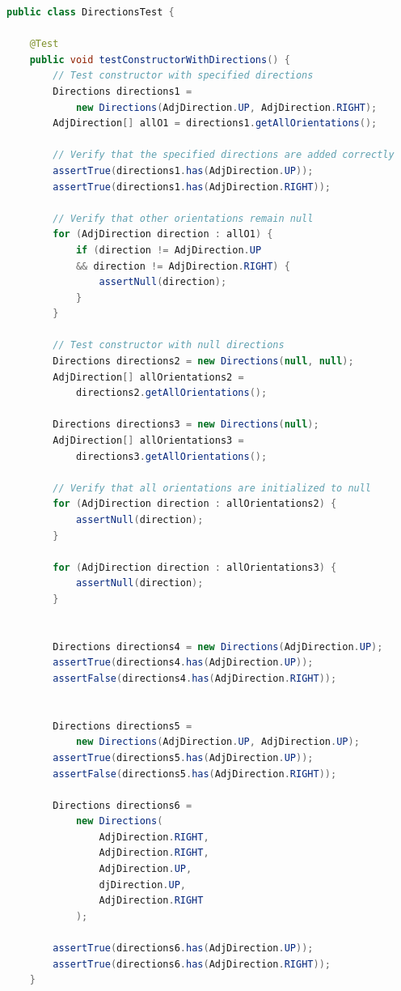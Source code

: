 \documentclass[a4paper,11pt]{article}
\begin{document}
\begin{lstlisting}[language=Java]
public class DirectionsTest {

    @Test
    public void testConstructorWithDirections() {
        // Test constructor with specified directions
        Directions directions1 =
            new Directions(AdjDirection.UP, AdjDirection.RIGHT);
        AdjDirection[] allO1 = directions1.getAllOrientations();

        // Verify that the specified directions are added correctly
        assertTrue(directions1.has(AdjDirection.UP));
        assertTrue(directions1.has(AdjDirection.RIGHT));

        // Verify that other orientations remain null
        for (AdjDirection direction : allO1) {
            if (direction != AdjDirection.UP 
            && direction != AdjDirection.RIGHT) {
                assertNull(direction);
            }
        }

        // Test constructor with null directions
        Directions directions2 = new Directions(null, null);
        AdjDirection[] allOrientations2 = 
            directions2.getAllOrientations();

        Directions directions3 = new Directions(null);
        AdjDirection[] allOrientations3 = 
            directions3.getAllOrientations();

        // Verify that all orientations are initialized to null
        for (AdjDirection direction : allOrientations2) {
            assertNull(direction);
        }

        for (AdjDirection direction : allOrientations3) {
            assertNull(direction);
        }


        Directions directions4 = new Directions(AdjDirection.UP);
        assertTrue(directions4.has(AdjDirection.UP));
        assertFalse(directions4.has(AdjDirection.RIGHT));


        Directions directions5 =
            new Directions(AdjDirection.UP, AdjDirection.UP);
        assertTrue(directions5.has(AdjDirection.UP));
        assertFalse(directions5.has(AdjDirection.RIGHT));

        Directions directions6 =
            new Directions(
                AdjDirection.RIGHT, 
                AdjDirection.RIGHT, 
                AdjDirection.UP, 
                djDirection.UP, 
                AdjDirection.RIGHT
            );
                
        assertTrue(directions6.has(AdjDirection.UP));
        assertTrue(directions6.has(AdjDirection.RIGHT));
    }


\end{lstlisting}
\end{document}

